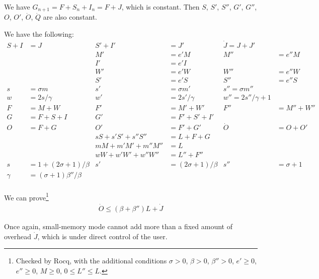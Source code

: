\documentclass{article}
\begin{document}
We have $G_{n+1} = F + S_n + I_n = F + J$, which is constant. Then $S$,
$S'$, $S''$, $G'$, $G''$, $O$, $O'$, $\dot{O}$, $\dot{Q}$
are also constant.

\bigskip

We have the following:
\begin{align*}
S+I &= J & S'+I' &= J' & \dot{J} = J + J' \\
 & & M' &= e'M  &  M'' &= e''M \\
 & & I' &= e'I \\
 & & W' &= e'W  &  W'' &= e''W \\
 & & S' &= e'S  &  S'' &= e''S \\
 s &= \sigma m  &  s' &= \sigma m'  &  s'' = \sigma m'' \\
 w &= 2s/\gamma  &  w' &= 2s'/\gamma  &  w'' = 2s''/\gamma + 1 \\
F &= M + W  &  F' &= M' + W'  &  F'' &= M'' + W'' \\
G &= F + S + I  &  G' &= F' + S' + I' \\
O &= F + G  &  O' &= F' + G' & \dot{O} &= O + O' \\
  &         & sS + s'S' + s''S'' &= L + F + G \\
             &         &  mM + m'M' + m''M'' &= L \\
             &         &  wW + w'W' + w''W'' &= L'' + F'' \\
 s &= 1 + (2\sigma +1)/\beta  &  s' &= (2\sigma+1)/\beta  &  s'' &=
 \sigma+1 \\
 \gamma &= (\sigma + 1)\beta''/\beta \\
\end{align*}

We can prove\footnote{
Checked by Rocq, with the additional conditions
$\sigma > 0$,
$\beta > 0$,
$\beta'' > 0$,
$e' \ge 0$,
$e'' \ge 0$,
$M \ge 0$,
$0 \le L'' \le L$.
}
\begin{gather}
\dot{O} \leq (\beta + \beta'')L + \dot{J}
\end{gather}

Once again, small-memory mode cannot add more than a
fixed amount of overhead $\dot{J}$, which is under direct control of
the user.
\end{document}
